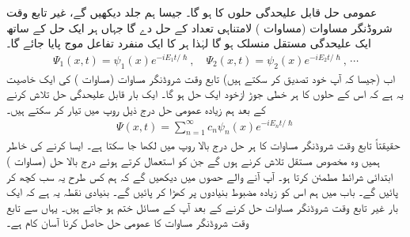 \quad
عمومی حل قابل علیحدگی حلوں کا  ہو گا۔ جیسا ہم جلد دیکھیں گے،  غیر تابع وقت شروڈنگر مساوات  (مساوات )   لامتناہی تعداد کے حل   دے گا جہاں ہر ایک حل کے ساتھ ایک علیحدگی مستقل  منسلک ہو گا لہٰذا  ہر  کا ایک منفرد تفاعل موج پایا جائے گا۔ 
\begin{align*}
\Psi_{1} (x,t) = \psi_{1}(x)e^{-iE_{1}t/\hslash} , \quad \Psi_{2} (x,t) = \psi_{2}(x)e^{-iE_{2}t/\hslash}, \, \cdots 
\end{align*}
اب (جیسا کہ آپ خود تصدیق کر سکتے ہیں)  تابع وقت شروڈنگر مساوات  (مساوات ) کی ایک خاصیت یہ ہے کہ اس کے حلوں کا ہر خطی جوڑ ازخود ایک حل ہو گا۔ ایک بار قابل علیحدگی حل تلاش کرنے کے بعد ہم زیادہ عمومی حل درج ذیل روپ میں تیار کر سکتے ہیں۔
\begin{align}\label{مساوات_شروڈنگر_خطی_جوڑ_عمومی_حل}
\Psi (x,t) = \sum_{n=1}^{\infty} c_{n} \psi_{n}(x)e^{-iE_{n}t/\hslash}
\end{align}
حقیقتاً  تابع وقت شروڈنگر مساوات کا ہر حل درج بالا روپ میں لکھا جا سکتا ہے۔ ایسا کرنے کی خاطر ہمیں وہ مخصوص مستقل 
  تلاش کرنے ہوں گے جن کو استعمال کرتے ہوئے درج بالا حل (مساوات ) ابتدائی شرائط مطمئن کرتا ہو۔ آپ آنے والے حصوں میں دیکھیں گے کہ ہم کس طرح یہ سب کچھ کر پائیں گے۔ باب  میں  ہم اس کو زیادہ مضبوط بنیادوں پر کھڑا کر پائیں گے۔ بنیادی نقطہ یہ ہے کہ ایک بار  غیر تابع وقت شروڈنگر مساوات حل کرنے کے بعد آپ کے مسائل ختم ہو جاتے ہیں۔ یہاں سے تابع وقت شروڈنگر مساوات کا عمومی حل حاصل کرنا آسان کام ہے۔ 

